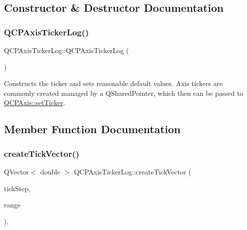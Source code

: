 \subsection{Constructor \& Destructor Documentation}
\mbox{\label{class_q_c_p_axis_ticker_log_af3cb86ea5eef2023c0b96b5260c4cbdf}} 
\subsubsection{\texorpdfstring{Q\+C\+P\+Axis\+Ticker\+Log()}{QCPAxisTickerLog()}}
{\footnotesize\ttfamily Q\+C\+P\+Axis\+Ticker\+Log\+::\+Q\+C\+P\+Axis\+Ticker\+Log (\begin{DoxyParamCaption}{ }\end{DoxyParamCaption})}

Constructs the ticker and sets reasonable default values. Axis tickers are commonly created managed by a Q\+Shared\+Pointer, which then can be passed to \hyperlink{class_q_c_p_axis_a4ee03fcd2c74d05cd1a419b9af5cfbdc}{Q\+C\+P\+Axis\+::set\+Ticker}. 

\subsection{Member Function Documentation}
\mbox{\label{class_q_c_p_axis_ticker_log_af8873a8d1d2b9392d8f7a73218c889ab}} 
\subsubsection{\texorpdfstring{create\+Tick\+Vector()}{createTickVector()}}
{\footnotesize\ttfamily Q\+Vector$<$ double $>$ Q\+C\+P\+Axis\+Ticker\+Log\+::create\+Tick\+Vector (\begin{DoxyParamCaption}\item[{double}]{tick\+Step,  }\item[{const \hyperlink{class_q_c_p_range}{Q\+C\+P\+Range} \&}]{range }\end{DoxyParamCaption})\hspace{0.3cm}{\ttfamily [protected]}, {\ttfamily [virtual]}}



